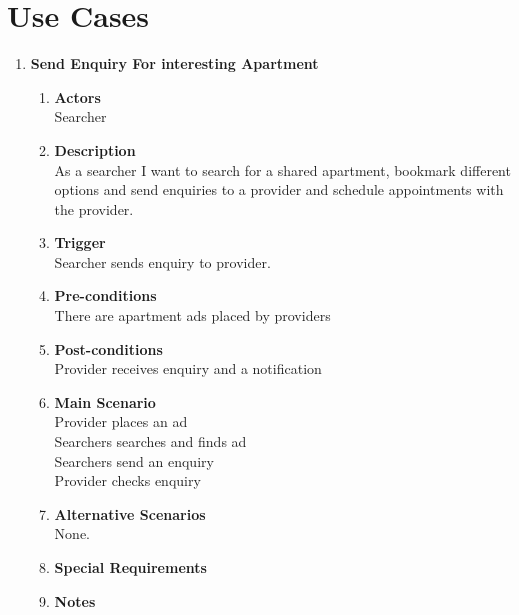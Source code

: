 \documentclass{scrreprt}
\begin{document}
\section{Use Cases}
\begin{enumerate}
	\item \textbf{Send Enquiry For interesting Apartment}
	\begin{enumerate}
		\item \textbf{Actors}  \\
			Searcher  \\

		\item \textbf{Description} \\
			As a searcher I want to search for a shared apartment, bookmark different options and send enquiries to a provider and schedule appointments with the provider.\\

		\item \textbf{Trigger} \\
			Searcher sends enquiry to provider.\\

		\item \textbf{Pre-conditions} \\
			There are apartment ads placed by providers\\

		\item \textbf{Post-conditions} \\
			Provider receives enquiry and a notification\\

		\item \textbf{Main Scenario} \\
			Provider places an ad\\
			Searchers searches and finds ad\\
			Searchers send an enquiry\\
			Provider checks enquiry\\

		\item \textbf{Alternative Scenarios} \\
			None.\\

		\item \textbf{Special Requirements} \\

		\item \textbf{Notes}\\
	\end{enumerate}
	

\end{enumerate}
\end{document}
